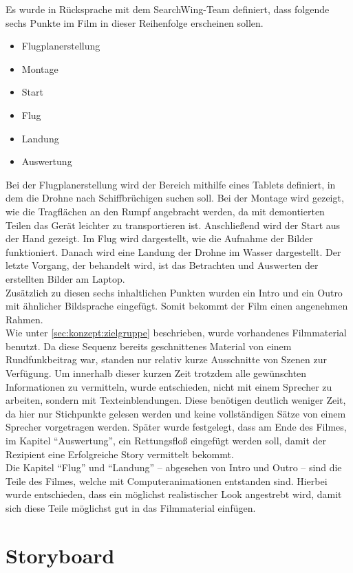 Es wurde in Rücksprache mit dem SearchWing-Team definiert, dass folgende sechs Punkte im Film in dieser Reihenfolge erscheinen sollen.

\begin{itemize}
\setlength\itemsep{0pt}
\item{Flugplanerstellung}
\item{Montage}
\item{Start}
\item{Flug}
\item{Landung}
\item{Auswertung}
\end{itemize}
\noindent
Bei der Flugplanerstellung wird der Bereich mithilfe eines Tablets definiert, in dem die Drohne nach Schiffbrüchigen suchen soll. Bei der Montage wird gezeigt, wie die Tragflächen an den Rumpf angebracht werden, da mit demontierten Teilen das Gerät leichter zu transportieren ist. Anschließend wird der Start aus der Hand gezeigt. Im Flug wird dargestellt, wie die Aufnahme der Bilder funktioniert. Danach wird eine Landung der Drohne im Wasser dargestellt. Der letzte Vorgang, der behandelt wird, ist das Betrachten und Auswerten der erstellten Bilder am Laptop.\\
Zusätzlich zu diesen sechs inhaltlichen Punkten wurden ein Intro und ein Outro mit ähnlicher Bildsprache eingefügt. Somit bekommt der Film einen angenehmen Rahmen.\\
Wie unter \autoref{sec:konzept:zielgruppe} beschrieben, wurde vorhandenes Filmmaterial benutzt. Da diese Sequenz bereits geschnittenes Material von einem Rundfunkbeitrag war, standen nur relativ kurze Ausschnitte von Szenen zur Verfügung. 
Um innerhalb dieser kurzen Zeit trotzdem alle gewünschten Informationen zu vermitteln, wurde entschieden, nicht mit einem Sprecher zu arbeiten, sondern mit Texteinblendungen. Diese benötigen deutlich weniger Zeit, da hier nur Stichpunkte gelesen werden und keine vollständigen Sätze von einem Sprecher vorgetragen werden.
Später wurde festgelegt, dass am Ende des Filmes, im Kapitel ``Auswertung'', ein Rettungsfloß eingefügt werden soll, damit der Rezipient eine Erfolgreiche Story vermittelt bekommt.\\
Die Kapitel ``Flug'' und ``Landung'' -- abgesehen von Intro und Outro -- sind die Teile des Filmes, welche mit Computeranimationen entstanden sind. Hierbei wurde entschieden, dass ein möglichst realistischer Look angestrebt wird, damit sich diese Teile möglichst gut in das Filmmaterial einfügen.

\section{Storyboard} %
\label{sec:konzept:animatic}

